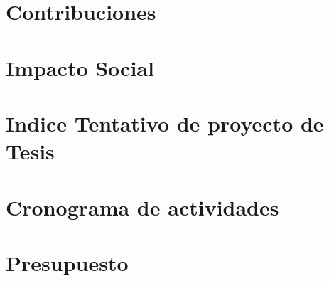 \documentclass[a4paper,12pt]{report}
\begin{document}
\section{Contribuciones}
\section{Impacto Social}
\section{Indice Tentativo de proyecto de Tesis}
\section{Cronograma de actividades}
\section{Presupuesto}
\nolinenumbers

\newpage
{}

\renewcommand{\refname}{Bibliografía}  %



\end{document}
